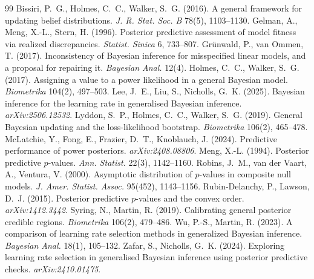 \documentclass[11pt]{article}
\theoremstyle{remark}
\begin{document}
\begin{thebibliography}{99}
\footnotesize
\setlength{\itemsep}{1pt}
\setlength{\parskip}{0pt}
 Bissiri, P.~G., Holmes, C.~C., Walker, S.~G. (2016).
A general framework for updating belief distributions. \emph{J. R. Stat. Soc. B} 78(5), 1103--1130.
 Gelman, A., Meng, X.-L., Stern, H. (1996). Posterior predictive
assessment of model fitness via realized discrepancies. \emph{Statist. Sinica} 6, 733--807.
 Gr\"unwald, P., van Ommen, T. (2017). Inconsistency of
Bayesian inference for misspecified linear models, and a proposal for repairing it. \emph{Bayesian Anal.} 12(4).
 Holmes, C.~C., Walker, S.~G. (2017). Assigning a value to a power
likelihood in a general Bayesian model. \emph{Biometrika} 104(2), 497--503.
 Lee, J.~E., Liu, S., Nicholls, G.~K. (2025). Bayesian inference for the
learning rate in generalised Bayesian inference. \emph{arXiv:2506.12532}.
 Lyddon, S.~P., Holmes, C.~C., Walker, S.~G. (2019). General Bayesian
updating and the loss-likelihood bootstrap. \emph{Biometrika} 106(2), 465--478.
 McLatchie, Y., Fong, E., Frazier, D.~T., Knoblauch, J. (2024).
Predictive performance of power posteriors. \emph{arXiv:2408.08806}.
 Meng, X.-L. (1994). Posterior predictive $p$-values. \emph{Ann. Statist.} 22(3),
1142--1160.
 Robins, J.~M., van der Vaart, A., Ventura, V. (2000). Asymptotic
distribution of $p$-values in composite null models. \emph{J. Amer. Statist. Assoc.} 95(452), 1143--1156.
 Rubin-Delanchy, P., Lawson, D.~J. (2015). Posterior predictive
$p$-values and the convex order. \emph{arXiv:1412.3442}.
 Syring, N., Martin, R. (2019). Calibrating general posterior
credible regions. \emph{Biometrika} 106(2), 479--486.
 Wu, P.-S., Martin, R. (2023). A comparison of learning rate selection
methods in generalized Bayesian inference. \emph{Bayesian Anal.} 18(1), 105--132.
 Zafar, S., Nicholls, G.~K. (2024). Exploring learning rate
selection in generalised Bayesian inference using posterior predictive checks. \emph{arXiv:2410.01475}.
\end{thebibliography}
\end{document}
